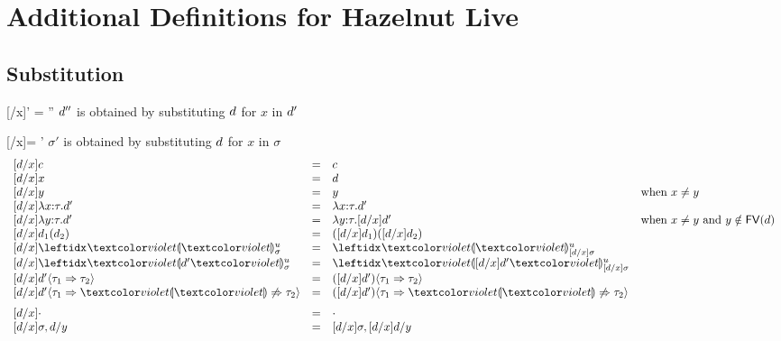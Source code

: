 
\newcommand{\additionalDefnsSec}{Additional Definitions for Hazelnut Live}
\section{\protect\additionalDefnsSec} %
\label{sec:additional-defns}

\subsection{Substitution}
\label{sec:substitution}
\judgbox
  {[\dexp/x]\dexp' = \dexp''}
  {$d''$ is obtained by substituting $d$ for $x$ in $d'$}

\vspace{5pt}
\judgbox
  {[\dexp/x]\sigma = \sigma'}
  {$\sigma'$ is obtained by substituting $d$ for $x$ in $\sigma$}
\[
\begin{array}{lcll}
\substitute{\dexp}{x}{c}
&=&
c\\
\substitute{\dexp}{x}{x}
&=&
\dexp
\\%
\substitute{\dexp}{x}{y}
&=&
y
& \text{when $x \neq y$}
\\
\substitute{\dexp}{x}{\halam{x}{\htau}{\dexp'}}
&=&
\halam{x}{\htau}{\dexp'}\\
\substitute{\dexp}{x}{\halam{y}{\htau}{\dexp'}}
&=&
\halam{y}{\htau}{\substitute{\dexp}{x}{\dexp'}}
& \text{when $x \neq y$ and $y \notin \fvof{d}$}
\\
\substitute{\dexp}{x}{\dap{\dexp_1}{\dexp_2}}
&=&
\dap{(\substitute{\dexp}{x}{\dexp_1})}{\substitute{\dexp}{x}{\dexp_2}}
\\
\substitute{\dexp}{x}{\dehole{u}{\subst}{}}
&=&
\dehole{u}{\substitute{\dexp}{x}{\subst}}{}
\\
\substitute{\dexp}{x}{\dhole{\dexp'}{u}{\subst}{}}
&=&
\dhole{\substitute{\dexp}{x}{\dexp'}}{u}{\substitute{\dexp}{x}{\subst}}{}
\\
\substitute{\dexp}{x}{\dcasttwo{\dexp'}{\htau_1}{\htau_2}}
&=&
\dcasttwo{(\substitute{\dexp}{x}{\dexp'})}{\htau_1}{\htau_2}
\\
\substitute{\dexp}{x}{\dcastfail{\dexp'}{\htau_1}{\htau_2}}
&=&
\dcastfail{(\substitute{\dexp}{x}{\dexp'})}{\htau_1}{\htau_2}
\\[6px]
\substitute{\dexp}{x}{\cdot}
&=&
\cdot\\
\substitute{\dexp}{x}{\sigma, d/y}
&=&
\substitute{\dexp}{x}{\sigma}, \substitute{\dexp}{x}{d}/y
\end{array}
\]

